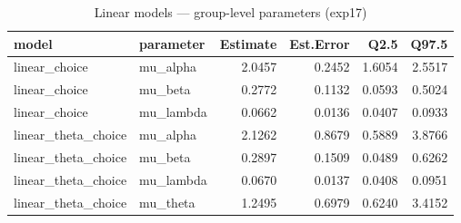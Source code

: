\begin{table}

\caption{Linear models — group-level parameters (exp17)}
\centering
\begin{tabular}[t]{llrrrr}
\toprule
model & parameter & Estimate & Est.Error & Q2.5 & Q97.5\\
\midrule
linear\_choice & mu\_alpha & 2.0457 & 0.2452 & 1.6054 & 2.5517\\
linear\_choice & mu\_beta & 0.2772 & 0.1132 & 0.0593 & 0.5024\\
linear\_choice & mu\_lambda & 0.0662 & 0.0136 & 0.0407 & 0.0933\\
linear\_theta\_choice & mu\_alpha & 2.1262 & 0.8679 & 0.5889 & 3.8766\\
linear\_theta\_choice & mu\_beta & 0.2897 & 0.1509 & 0.0489 & 0.6262\\
\addlinespace
linear\_theta\_choice & mu\_lambda & 0.0670 & 0.0137 & 0.0408 & 0.0951\\
linear\_theta\_choice & mu\_theta & 1.2495 & 0.6979 & 0.6240 & 3.4152\\
\bottomrule
\end{tabular}
\end{table}
